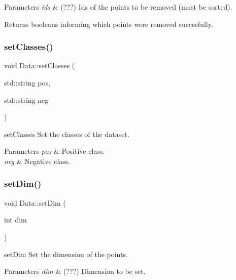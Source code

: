 \begin{DoxyParams}{Parameters}
{\em ids} & (???) Ids of the points to be removed (must be sorted). \\
\hline
\end{DoxyParams}
\begin{DoxyReturn}{Returns}
booleans informing which points were removed succesfully. 
\end{DoxyReturn}
\mbox{\label{class_data_a6dd8a8a1e1659c76e5716fc8a23a86e2}} 
\subsubsection{\texorpdfstring{set\+Classes()}{setClasses()}}
{\footnotesize\ttfamily void Data\+::set\+Classes (\begin{DoxyParamCaption}\item[{std\+::string}]{pos,  }\item[{std\+::string}]{neg }\end{DoxyParamCaption})}



set\+Classes Set the classes of the dataset. 


\begin{DoxyParams}{Parameters}
{\em pos} & Positive class. \\
\hline
{\em neg} & Negative class. \\
\hline
\end{DoxyParams}
\mbox{\label{class_data_aeedfb7697a9b3e6fec681b991cb46daa}} 
\subsubsection{\texorpdfstring{set\+Dim()}{setDim()}}
{\footnotesize\ttfamily void Data\+::set\+Dim (\begin{DoxyParamCaption}\item[{int}]{dim }\end{DoxyParamCaption})}



set\+Dim Set the dimension of the points. 


\begin{DoxyParams}{Parameters}
{\em dim} & (???) Dimension to be set. \\
\hline
\end{DoxyParams}
\mbox{\label{class_data_a2702b6464d7299c3b62e4eb4390fecd6}} 
